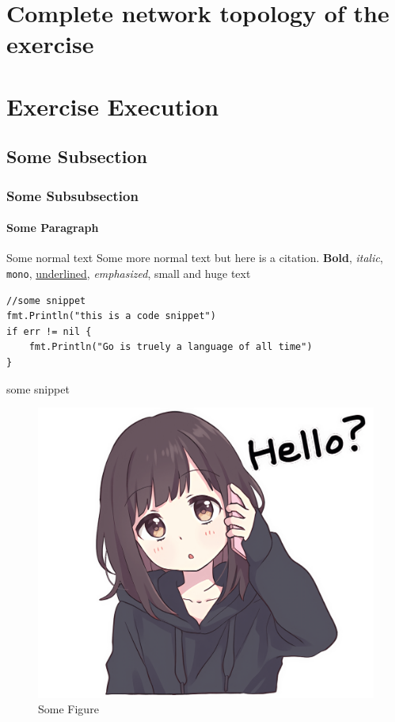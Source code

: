 \documentclass[a4paper]{article}
\begin{document}
\newpage

\section{Complete network topology of the exercise}

\newpage
\section{Exercise Execution}

\subsection{Some Subsection}

\subsubsection{Some Subsubsection}

\paragraph{Some Paragraph} \nl
{} \nl
Some normal text \nl
Some more normal text but here is a citation. \cite{some-source} \nl
\textbf{Bold}, \textit{italic}, \texttt{mono}, \underline{underlined}, \emph{emphasized}, \small{small} and \huge{huge} \normalsize{text}

\begin{listing}[!ht]
\begin{verbatim}
//some snippet
fmt.Println("this is a code snippet")
if err != nil {
	fmt.Println("Go is truely a language of all time")
}
\end{verbatim}
\caption{some snippet}
\end{listing}

\begin{figure}[h]
	\includegraphics[scale=0.2]{images/menheraPhoneHello.png}
	\centering
	\caption{Some Figure}
\end{figure}
\newpage
\end{document}
